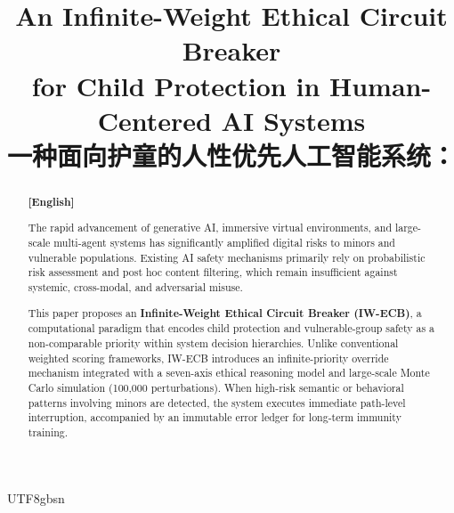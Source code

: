 \documentclass[conference]{IEEEtran}
\begin{document}
\begin{CJK}{UTF8}{gbsn}

\title{An Infinite-Weight Ethical Circuit Breaker \\
for Child Protection in Human-Centered AI Systems\\
\vspace{0.3cm}
{\large 一种面向护童的人性优先人工智能系统：\\
}}

\author{
\and
{}
}

\maketitle

\begin{abstract}
\textbf{[English]}

The rapid advancement of generative AI, immersive virtual environments, and large-scale multi-agent systems has significantly amplified digital risks to minors and vulnerable populations. Existing AI safety mechanisms primarily rely on probabilistic risk assessment and post hoc content filtering, which remain insufficient against systemic, cross-modal, and adversarial misuse.

This paper proposes an \textbf{Infinite-Weight Ethical Circuit Breaker (IW-ECB)}, a computational paradigm that encodes child protection and vulnerable-group safety as a non-comparable priority within system decision hierarchies. Unlike conventional weighted scoring frameworks, IW-ECB introduces an infinite-priority override mechanism integrated with a seven-axis ethical reasoning model and large-scale Monte Carlo simulation (100,000 perturbations). When high-risk semantic or behavioral patterns involving minors are detected, the system executes immediate path-level interruption, accompanied by an immutable error ledger for long-term immunity training.


\end{abstract}
\end{CJK}
\end{document}
